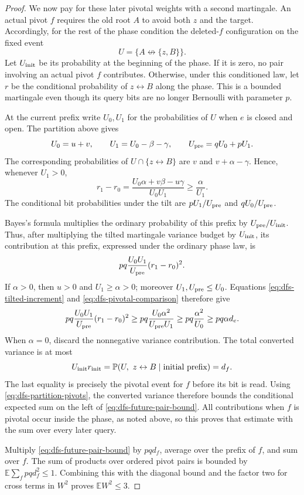 \documentclass[11pt]{article}
\theoremstyle{definition}
\begin{document}
\begin{proof}
We now pay for these later pivotal weights with a second martingale.
An actual pivot $f$ requires the old root $A$ to avoid both $z$ and the
target. Accordingly, for the rest of the phase condition the deleted-$f$
configuration on the fixed event
\[
 U=\{A\not\leftrightarrow\{z,B\}\}.
\]
Let $U_{\rm init}$ be its probability at the beginning of the phase.
If it is zero, no pair involving an actual pivot $f$ contributes.
Otherwise, under this conditioned law, let $r$ be the conditional
probability of $z\leftrightarrow B$ along the phase. This is a
bounded martingale even though its query bits are no longer Bernoulli
with parameter $p$.

At the current prefix write $U_0,U_1$ for the probabilities of $U$
when $e$ is closed and open. The partition above gives
\[
 U_0=u+v,\qquad U_1=U_0-\beta-\gamma,
 \qquad U_{\rm pre}=qU_0+pU_1.
\]
The corresponding probabilities of $U\cap\{z\leftrightarrow B\}$
are $v$ and $v+\alpha-\gamma$. Hence, whenever $U_1>0$,
\begin{equation}\label{eq:dfs-tilted-increment}
 r_1-r_0
 =\frac{U_0\alpha+v\beta-u\gamma}{U_0U_1}
 \ge\frac\alpha{U_1}.
\end{equation}
The conditional bit probabilities under the tilt are
$pU_1/U_{\rm pre}$ and $qU_0/U_{\rm pre}$.

Bayes's formula multiplies the ordinary probability of this prefix by
$U_{\rm pre}/U_{\rm init}$. Thus, after multiplying the tilted
martingale variance budget by $U_{\rm init}$, its contribution at
this prefix, expressed under the ordinary phase law, is
\[
 pq\frac{U_0U_1}{U_{\rm pre}}(r_1-r_0)^2.
\]
If $\alpha>0$, then $u>0$ and $U_1\ge\alpha>0$; moreover
$U_1,U_{\rm pre}\le U_0$. Equations
\eqref{eq:dfs-tilted-increment} and
\eqref{eq:dfs-pivotal-comparison} therefore give
\begin{equation}\label{eq:dfs-converted-budget}
 pq\frac{U_0U_1}{U_{\rm pre}}(r_1-r_0)^2
 \ge pq\frac{U_0\alpha^2}{U_{\rm pre}U_1}
 \ge pq\frac{\alpha^2}{U_0}
 \ge pq\alpha d_e.
\end{equation}
When $\alpha=0$, discard the nonnegative variance contribution.
The total converted variance is at most
\[
 U_{\rm init}r_{\rm init}
 =\mathbb P(U,\ z\leftrightarrow B\mid\text{initial prefix})=d_f.
\]
The last equality is precisely the pivotal event for $f$ before its
bit is read. Using \eqref{eq:dfs-partition-pivots}, the converted variance therefore
bounds the conditional expected sum on the left of
\eqref{eq:dfs-future-pair-bound}. All contributions when $f$ is pivotal
occur inside the phase, as noted above, so this proves that estimate
with the sum over every later query.

Multiply \eqref{eq:dfs-future-pair-bound} by $pq d_f$, average over
the prefix of $f$, and sum over $f$. The sum of products over ordered
pivot pairs is bounded by
$\mathbb E\sum_f pq d_f^2\le1$. Combining this with the diagonal bound
and the factor two for cross terms in $W^2$ proves $\mathbb E W^2\le3$.
\end{proof}
\end{document}
